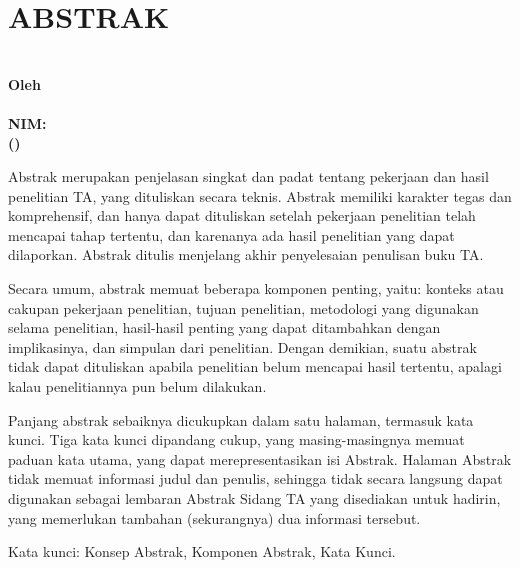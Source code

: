 \chapter{ABSTRAK}
\label{chp:abstrak}
\vspace{\baselineskip}
\begin{center}
  \bfseries\large
  \MakeUppercase{\titlename} \\
  \vspace{1\baselineskip}
  \normalsize\normalfont Oleh \\
  \bfseries\large \authorname \\
  NIM: \authorid \\
  (\department) \\
\end{center}

\vspace{2\baselineskip}
Abstrak merupakan penjelasan singkat dan padat tentang pekerjaan dan hasil penelitian TA, yang dituliskan secara teknis. Abstrak memiliki karakter tegas dan komprehensif, dan hanya dapat dituliskan setelah pekerjaan penelitian telah mencapai tahap tertentu, dan karenanya ada hasil penelitian yang dapat dilaporkan. Abstrak ditulis menjelang akhir penyelesaian penulisan buku TA.
\vspace{\baselineskip}

Secara umum, abstrak memuat beberapa komponen penting, yaitu: konteks atau cakupan pekerjaan penelitian, tujuan penelitian, metodologi yang digunakan selama penelitian, hasil-hasil penting yang dapat ditambahkan dengan implikasinya, dan simpulan dari penelitian. Dengan demikian, suatu abstrak tidak dapat dituliskan apabila penelitian belum mencapai hasil tertentu, apalagi kalau penelitiannya pun belum dilakukan.
\vspace{\baselineskip}

Panjang abstrak sebaiknya dicukupkan dalam satu halaman, termasuk kata kunci. Tiga kata kunci dipandang cukup, yang masing-masingnya memuat paduan kata utama, yang dapat merepresentasikan isi Abstrak. Halaman Abstrak tidak memuat informasi judul dan penulis, sehingga tidak secara langsung dapat digunakan sebagai lembaran Abstrak Sidang TA yang disediakan untuk hadirin, yang memerlukan tambahan (sekurangnya) dua informasi tersebut.

\begin{flushleft}
  Kata kunci: Konsep Abstrak, Komponen Abstrak, Kata Kunci.
\end{flushleft}